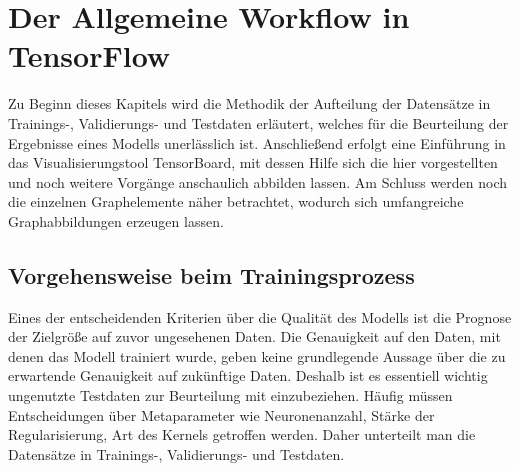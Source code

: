 \chapter{Der Allgemeine Workflow in TensorFlow}

Zu Beginn dieses Kapitels wird die Methodik der Aufteilung der Datensätze in Trainings-, Validierungs- und Testdaten erläutert, welches für die Beurteilung der Ergebnisse eines Modells unerlässlich ist. Anschließend erfolgt eine Einführung in das Visualisierungstool TensorBoard, mit dessen Hilfe sich die hier vorgestellten und noch weitere Vorgänge anschaulich abbilden lassen. Am Schluss werden noch die einzelnen Graphelemente näher betrachtet, wodurch sich umfangreiche Graphabbildungen erzeugen lassen. 


\section{Vorgehensweise beim Trainingsprozess}


Eines der entscheidenden Kriterien über die Qualität des Modells ist die Prognose der Zielgröße auf zuvor ungesehenen Daten. Die Genauigkeit auf den Daten, mit denen das Modell trainiert wurde, geben keine grundlegende Aussage über die zu erwartende Genauigkeit auf zukünftige Daten. Deshalb ist es essentiell wichtig ungenutzte Testdaten zur Beurteilung mit einzubeziehen. Häufig müssen Entscheidungen über Metaparameter wie Neuronenanzahl, Stärke der Regularisierung, Art des Kernels getroffen werden. Daher unterteilt man die Datensätze in Trainings-, Validierungs- und Testdaten.  \cite{hoffmann2014proceedings}
\vspace{10pt}

